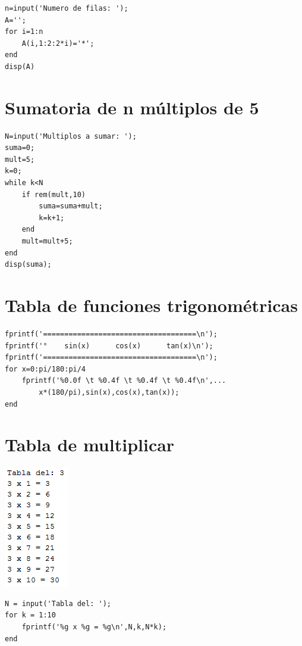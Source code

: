 \sol

\begin{verbatim}
n=input('Numero de filas: ');
A='';
for i=1:n
    A(i,1:2:2*i)='*';
end
disp(A)
\end{verbatim}


\section{Sumatoria de n múltiplos de 5}


\begin{verbatim}
N=input('Multiplos a sumar: ');
suma=0;
mult=5;
k=0;
while k<N
    if rem(mult,10)
        suma=suma+mult;
        k=k+1;
    end
    mult=mult+5;
end
disp(suma);
\end{verbatim}

\section{Tabla de funciones trigonométricas}


\begin{verbatim}
fprintf('====================================\n');
fprintf('°    sin(x)      cos(x)      tan(x)\n');
fprintf('====================================\n');
for x=0:pi/180:pi/4
    fprintf('%0.0f \t %0.4f \t %0.4f \t %0.4f\n',...
        x*(180/pi),sin(x),cos(x),tan(x));
end
\end{verbatim}

\section{Tabla de multiplicar} 


\begin{center}
\includegraphics[scale=0.8]{src/tablamult.png}
\end{center}

\sol

\begin{verbatim}
N = input('Tabla del: ');
for k = 1:10
    fprintf('%g x %g = %g\n',N,k,N*k);
end
\end{verbatim}
